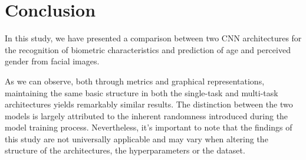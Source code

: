\section{Conclusion} \label{sec:conclusions}
In this study, we have presented a comparison between two CNN
architectures for the recognition of biometric characteristics
and prediction of age and perceived gender from facial images.

As we can observe, both through metrics and graphical representations,
maintaining the same basic structure in both the single-task and multi-task
architectures yields remarkably similar results.
The distinction between the two models is largely attributed to the
inherent randomness introduced during the model training process.
Nevertheless, it's important to note that the findings of this study
are not universally applicable and may vary when altering the
structure of the architectures, the hyperparameters or the dataset.